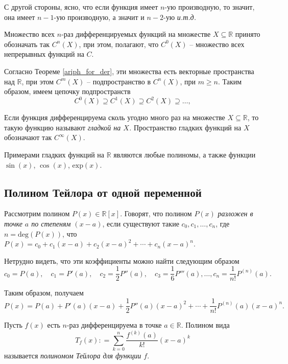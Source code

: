 \begin{remark}
    С другой стороны, ясно, что если функция имеет $n$-ую производную, то значит, она имеет $n-1$-ую производную, а значит и $n-2$-ую \textit{и.т.д.}
\end{remark}

Множество всех $n$-раз дифференцируемых функций на множестве $X \subseteq \mathbb{R}$ принято обозначать так $C^n(X)$, при этом, полагают, что $C^0(X)$ -- множество всех непрерывных функций на $C$.

Согласно Теореме \ref{ariph_for_der}, эти множества есть векторные пространства над $\mathbb{R}$, при этом $C^{m}(X)$ -- подпространство в $C^n(X)$, при $m \ge n$. Таким образом, имеем цепочку подпространств 
\[
 C^0(X) \supseteq C^1(X) \supseteq C^2(X) \supseteq \ldots,
\]

\begin{definition}
Если функция дифференцируема сколь угодно много раз на множестве $X\subseteq \mathbb{R}$, то такую функцию называют \textit{гладкой на $X$.} Пространство гладких функций на $X$ обозначают так $C^\infty(X).$ 
\end{definition}

Примерами гладких функций на $\mathbb{R}$ являются любые полиномы, а также функции $\sin(x)$, $\cos(x)$, $\mathrm{exp}(x)$.



\subsection{Полином Тейлора от одной переменной}

Рассмотрим полином $P(x) \in \mathbb{R}[x]$. Говорят, что полином $P(x)$ \textit{разложен в точке $a$ по степеням $(x-a)$}, если существуют такие $c_0, c_1, \ldots, c_n$, где $n = \mathrm{deg}(P(x))$, что $P(x) = c_0 + c_1(x-a) + c_2(x-a)^2 + \cdots + c_n(x-a)^n$. 

Нетрудно видеть, что эти коэффициенты можно найти следующим образом
\[
 c_0 = P(a), \quad c_1 = P'(a), \quad c_2 = \frac{1}{2}P''(a), \quad c_3 = \frac{1}{6}P'''(a), \ldots,  c_n = \frac{1}{n!}P^{(n)}(a).
\]

Таким образом, получаем
\[
 P(x) = P(a) + P'(a)(x-a) + \frac{1}{2} P''(a)(x-a)^2 + \cdots + \frac{1}{n!}P^{(n)}(a)(x-a)^n.
\]


\begin{definition}
    Пусть $f(x)$ есть $n$-раз дифференцируема в точке $a\in \mathbb{R}$. Полином вида 
    \[
     T_f(x): = \sum_{k=0}^n \frac{f^{(k)}(a)}{k!}(x-a)^k
    \]
    называется \textit{полиномом Тейлора для функции $f$}.
\end{definition}


